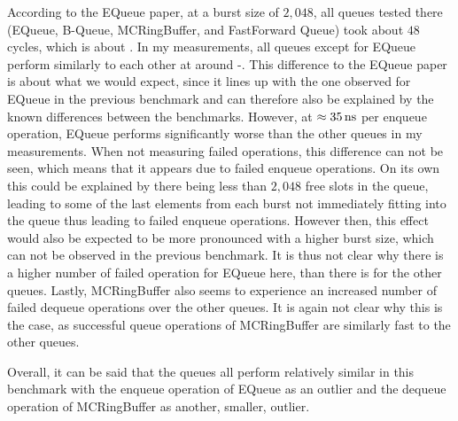 According to the EQueue paper, at a burst size of $2,048$, all queues tested there (EQueue, B-Queue,
MCRingBuffer, and FastForward Queue) took about $48$ cycles, which is about .
In my measurements, all queues except for EQueue perform similarly to each other at around -.
This difference to the EQueue paper is about what we would expect, since it lines up with the one observed
for EQueue in the previous benchmark and can therefore also be explained by the known differences between the
benchmarks.
However, at $\approx \SI{35}{\nano\second}$ per enqueue operation, EQueue performs significantly worse than the other
queues in my measurements.
When not measuring failed operations, this difference can not be seen, which means that it appears due to
failed enqueue operations.
On its own this could be explained by there being less than $2,048$ free slots in the queue, leading to some
of the last elements from each burst not immediately fitting into the queue thus leading to failed enqueue operations.
However then, this effect would also be expected to be more pronounced with a higher burst size, which can
not be observed in the previous benchmark.
It is thus not clear why there is a higher number of failed operation for EQueue here, than there is for the
other queues.
Lastly, MCRingBuffer also seems to experience an increased number of failed dequeue operations over the other queues.
It is again not clear why this is the case, as successful queue operations of MCRingBuffer are similarly fast
to the other queues.

Overall, it can be said that the queues all perform relatively similar in this benchmark with the enqueue
operation of EQueue as an outlier and the dequeue operation of MCRingBuffer as another, smaller, outlier.

